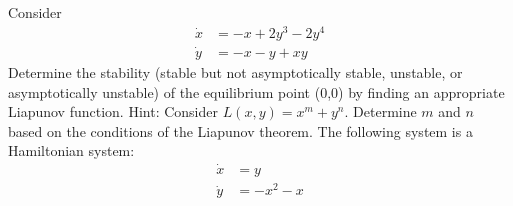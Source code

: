 \documentclass{exam}
\begin{document}
\begin{questions}
    \question[10]
        Consider
        \begin{equation*}
            \begin{aligned}
                \dot{x} &= -x + 2y^3 - 2y^4\\
                \dot{y} &= -x-y+xy
            \end{aligned}
        \end{equation*}
        Determine the stability (stable but not asymptotically stable, unstable, or asymptotically unstable) of the equilibrium point (0,0) by finding an appropriate Liapunov function. 
        Hint: Consider $L(x,y) = x^m + y^n$. Determine $m$ and $n$ based on the conditions of the Liapunov theorem.
    \question[20]
        The following system is a Hamiltonian system:
        \begin{equation*}
            \begin{aligned}
                \dot{x} &= y\\
                \dot{y} &= -x^2 - x
            \end{aligned}
        \end{equation*}
\end{questions}
\end{document}
